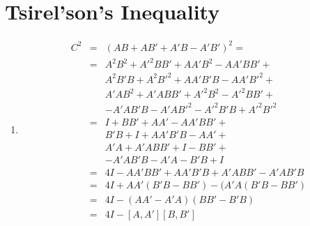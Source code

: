 \documentclass[12pt]{article}
\begin{document}
\newcommand{\braket}[2]{\langle #1|#2 \rangle}
\newcommand{\normtwo}{\frac{1}{\sqrt{2}}}

\section{Tsirel'son's Inequality}

\begin{enumerate}

\item %
%
\begin{eqnarray*}
C^2 & = & (AB + AB' + A'B - A'B')^2 =\\
    & = & A^2B^2 + A'^2BB' + AA'B^2 - AA'BB' +\\
    &   & A^2B'B + A^2B'^2 + AA'B'B - AA'B'^2 +\\
    &   & A'AB^2 + A'ABB' + A'^2B^2 - A'^2BB' +\\
    &   & -A'AB'B - A'AB'^2 - A'^2B'B + A'^2B'^2\\
    & = & I + BB' + AA' - AA'BB' +\\
    &   & B'B + I + AA'B'B - AA' +\\
    &   & A'A + A'ABB' + I - BB' +\\
    &   & -A'AB'B - A'A - B'B + I\\
    & = & 4I - AA'BB' + AA'B'B + A'ABB' - A'AB'B\\
    & = & 4I + AA'(B'B-BB') - (A'A(B'B-BB')\\
    & = & 4I - (AA'-A'A)(BB'-B'B)\\
    & = & 4I - [A,A'][B,B']
\end{eqnarray*}


\end{enumerate}
\end{document}
